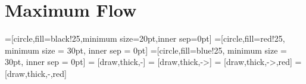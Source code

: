 \section{Maximum Flow}
  =[circle,fill=black!25,minimum size=20pt,inner sep=0pt]
  =[circle,fill=red!25, minimum size = 30pt, inner sep = 0pt]
  =[circle,fill=blue!25, minimum size = 30pt, inner sep = 0pt]
   = [draw,thick,-]
   = [draw,thick,->]
   = [draw,thick,->,red]
   = [draw,thick,-,red]



